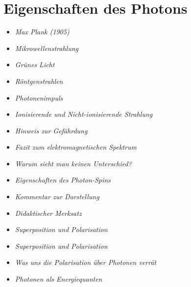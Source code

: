 \section{Eigenschaften des Photons}
\medskip
\begin{tcolorbox}[title=physikalische Boxen,physikbox]

\begin{itemize}
	\item \emph{Max Plank (1905)} \dotfill\pageref{box:planck1948}
	\item \emph{Mikrowellenstrahlung}\dotfill\pageref{box:Mikrowellenstrahlung}
	\item \emph{Grünes Licht} \dotfill\pageref{box:grünesLicht}
	\item \emph{Röntgenstrahlen} \dotfill\pageref{box:röntgenstrahlen}
	\item \emph{Photonenimpuls} \dotfill\pageref{box:Photonenimpuls}
	\item \emph{Ionisierende und Nicht-ionisierende Strahlung} \dotfill\pageref{box:ionisierende}
	\item \emph{Hinweis zur Gefährdung} \dotfill\pageref{box:Hinweis zur Gefärdung}
	\item \emph{Fazit zum elektromagnetischen Spektrum} \dotfill\pageref{box:Fazit zum elektro}
	\item \emph{Warum sieht man keinen Unterschied?} \dotfill\pageref{box:Warum sieht man}
    \item \emph{Eigenschaften des Photon-Spins} \dotfill\pageref{box:Eigenschaften des}
	\item \emph{Kommentar zur Darstellung}\dotfill\pageref{box:Kommentar zur Darstellung}
	\item \emph{Didaktischer Merksatz} \dotfill\pageref{box:didaktischerMerksatz}
	\item \emph{Superposition und Polarisation} \dotfill\pageref{box:Superposition}
	\item \emph{Superposition und Polarisation}\dotfill\pageref{box:Superposition und Polarisation}
	\item \emph{Was uns die Polarisation über Photonen verrät} \dotfill\pageref{box:Was uns die}

\end{itemize}
\end{tcolorbox}

\medskip
\begin{tcolorbox}[title=mathematische Boxen,mathebox]
\begin{itemize}
	\item \emph{Photonen als Energiequanten}\dotfill\pageref{box:Photon als Energiequanten}
\end{itemize}
\end{tcolorbox}

